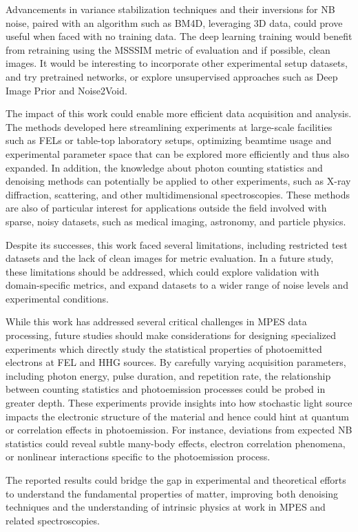 Advancements in variance stabilization techniques and their inversions for \gls{NB} noise, paired with an algorithm such as BM4D, leveraging 3D data, could prove useful when faced with no training data. The deep learning training would benefit from retraining using the \gls{MSSSIM} metric of evaluation and if possible, clean images. It would be interesting to incorporate other experimental setup datasets, and try pretrained networks, or explore unsupervised approaches such as Deep Image Prior and Noise2Void.

The impact of this work could enable more efficient data acquisition and analysis. The methods developed here streamlining experiments at large-scale facilities such as \glspl{FEL} or table-top laboratory setups, optimizing beamtime usage and experimental parameter space that can be explored more efficiently and thus also expanded. In addition, the knowledge about photon counting statistics and denoising methods can potentially be applied to other experiments, such as X-ray diffraction, scattering, and other multidimensional spectroscopies. These methods are also of particular interest for applications outside the field involved with sparse, noisy datasets, such as medical imaging, astronomy, and particle physics.

Despite its successes, this work faced several limitations, including restricted test datasets and the lack of clean images for metric evaluation. In a future study, these limitations should be addressed, which could explore validation with domain-specific metrics, and expand datasets to a wider range of noise levels and experimental conditions.

While this work has addressed several critical challenges in \gls{MPES} data processing, future studies should make considerations for designing specialized experiments which directly study the statistical properties of photoemitted electrons at \gls{FEL} and \gls{HHG} sources. By carefully varying acquisition parameters, including photon energy, pulse duration, and repetition rate, the relationship between counting statistics and photoemission processes could be probed in greater depth. These experiments provide insights into how stochastic light source impacts the electronic structure of the material and hence could hint at quantum or correlation effects in photoemission. For instance, deviations from expected \gls{NB} statistics could reveal subtle many-body effects, electron correlation phenomena, or nonlinear interactions specific to the photoemission process.

The reported results could bridge the gap in experimental and theoretical efforts to understand the fundamental properties of matter, improving both denoising techniques and the understanding of intrinsic physics at work in MPES and related spectroscopies.

